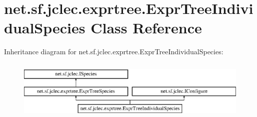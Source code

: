 \hypertarget{classnet_1_1sf_1_1jclec_1_1exprtree_1_1_expr_tree_individual_species}{\section{net.\-sf.\-jclec.\-exprtree.\-Expr\-Tree\-Individual\-Species Class Reference}
\label{classnet_1_1sf_1_1jclec_1_1exprtree_1_1_expr_tree_individual_species}
}
Inheritance diagram for net.\-sf.\-jclec.\-exprtree.\-Expr\-Tree\-Individual\-Species\-:\begin{figure}[H]
\begin{center}
\leavevmode
\includegraphics[height=2.916667cm]{classnet_1_1sf_1_1jclec_1_1exprtree_1_1_expr_tree_individual_species}
\end{center}
\end{figure}
